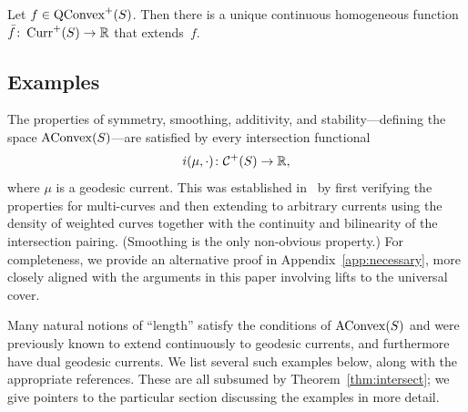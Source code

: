 \begin{theorem}{\cite[Theorem~A]{MGT21:Smoothings}}\label{thm:convex}
   Let $f \in \mathrm{QConvex}^+(S)$. Then there is a unique continuous homogeneous function
  $\bar{f} \colon \operatorname{Curr}^+(S) \to \mathbb{R}$ that extends~$f$.
\end{theorem}

\subsection{Examples}
\label{subsec:examples}
The properties of symmetry,
smoothing, additivity, and stability---defining the space
$\mathrm{AConvex}(S)$---are satisfied by every intersection functional
\[
i(\mu,\cdot) \colon \mathcal{C}^+(S) \to \mathbb{R},
\]
where $\mu$ is a geodesic current. This was established
in~\cite[Section~4]{MGT21:Smoothings} by first verifying the
properties for multi-curves and then extending to arbitrary currents
using the density of weighted curves together with the continuity and
bilinearity of the intersection pairing. (Smoothing is the only
non-obvious property.)
For completeness, we provide an alternative proof in
Appendix~\ref{app:necessary}, more closely aligned with the arguments
in this paper
involving lifts to the universal cover.

Many natural notions of ``length'' satisfy the conditions of
$\mathrm{AConvex}(S)$ and were previously known
to extend continuously to geodesic currents, and furthermore have dual
geodesic currents. We list several such examples below, along with the
appropriate references. These are all subsumed by
Theorem~\ref{thm:intersect}; we give pointers to the particular
section discussing the examples in more detail.

